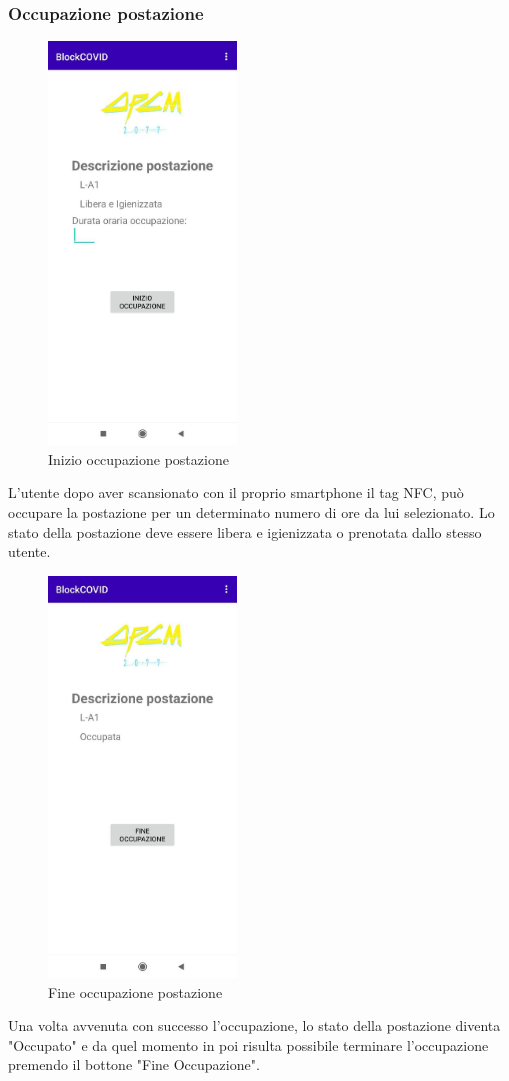 	\subsubsection{Occupazione postazione}
	\begin{figure}[H]
		\centering
		\includegraphics[width=5cm]{res/images/inizioOccupazione.png}
		\caption{Inizio occupazione postazione}
	\end{figure}
	L'utente dopo aver scansionato con il proprio smartphone il tag NFC, può occupare la postazione per un determinato numero di ore da lui selezionato. Lo stato della postazione deve essere libera e igienizzata o prenotata dallo stesso utente.
	\begin{figure}[H]
		\centering
		\includegraphics[width=5cm]{res/images/occupata.png}
		\caption{Fine occupazione postazione}
	\end{figure}
	Una volta avvenuta con successo l'occupazione, lo stato della postazione diventa "Occupato" e da quel momento in poi risulta possibile terminare l'occupazione premendo il bottone "Fine Occupazione".

